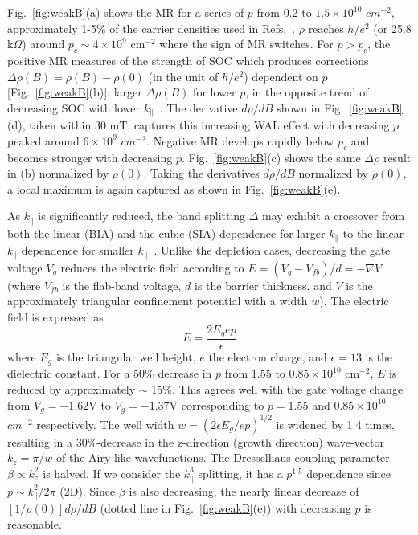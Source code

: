 \documentclass[twocolumn,secnumarabic,amssymb, nobibnotes, aps, prd]{revtex4-1}
\begin{document}
Fig.~\ref{fig:weakB}(a) shows the MR for a series of $p$ from 0.2 to $1.5\times10^{10}$ $cm^{-2}$, approximately 1-5\% of the carrier densities used in Refs.~\cite{SOI1,SOI2}. $\rho$ reaches $h/e^2$ (or 25.8 k$\Omega$) around $p_c\sim 4\times10^{9}$ cm$^{-2}$ where the sign of MR switches. For $p>p_c$, the positive MR measures of the strength of SOC which produces corrections $\Delta\rho(B)=\rho(B)-\rho(0)$ (in the unit of $h/e^2$) dependent on $p$ [Fig.~\ref{fig:weakB}(b)]: larger $\Delta\rho(B)$ for lower $p$, in the opposite trend of decreasing SOC with lower $k_{\parallel}$~\cite{Rahimi}. The derivative $d\rho/dB$ shown in Fig.~\ref{fig:weakB}(d), taken within 30 mT, captures this increasing WAL effect with decreasing $p$ peaked around $6\times10^{9}$ $cm^{-2}$. Negative MR develops rapidly below $p_c$ and becomes stronger with decreasing $p$. Fig.~\ref{fig:weakB}(c) shows the same $\Delta\rho$ result in (b) normalized by $\rho(0)$. Taking the derivatives $d\rho/dB$ normalized by $\rho(0)$, a local maximum is again captured as shown in Fig.~\ref{fig:weakB}(e).

As $k_{\parallel}$ is significantly reduced, the band splitting $\Delta$ may exhibit a crossover from both the linear (BIA) and the cubic (SIA) dependence for larger $k_{\parallel}$ to the linear-$k_{\parallel}$ dependence for smaller $k_{\parallel}$~\cite{winkler}. Unlike the depletion cases, decreasing the gate voltage $V_g$ reduces the electric field according to $E=(V_g-V_{fb})/d=-\nabla V$ (where $V_{fb}$ is the flab-band voltage, $d$ is the barrier thickness, and $V$ is the approximately triangular confinement potential with a width $w$). The electric field is expressed as
\begin{equation}
E=\frac{2E_g ep}{\epsilon}   
\end{equation}
where $E_g$ is the triangular well height, $e$ the electron charge, and $\epsilon=13$ is the dielectric constant. For a 50\% decrease in $p$ from 1.55 to $0.85\times10^{10}$ cm$^{-2}$, $E$ is reduced by approximately $\sim$ 15\%. This agrees well with the gate voltage change from $V_g=-1.62$V to $V_g=-1.37$V corresponding to $p=$1.55 and $0.85\times10^{10}$ $cm^{-2}$ respectively. The well width $w=(2\epsilon E_g/ep)^{1/2}$ is widened by 1.4 times, resulting in a 30\%-decrease in the z-direction (growth direction) wave-vector $k_z=\pi/w$ of the Airy-like wavefunctions. The Dresselhaus coupling parameter $\beta\propto k_z^2$ is halved. If we consider the $k_{\parallel}^3$ splitting, it has a $p^{1.5}$ dependence since $p\sim k_{\parallel}^2/2\pi$ (2D). Since $\beta$ is also decreasing, the nearly linear decrease of $[1/\rho(0)]d\rho/dB$ (dotted line in Fig.~\ref{fig:weakB}(e)) with decreasing $p$ is reasonable. 
\end{document}
